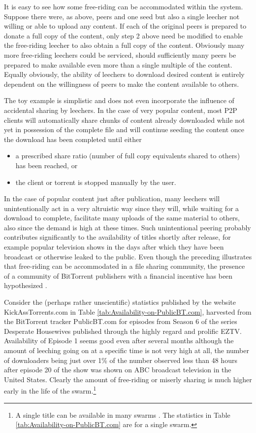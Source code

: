 \documentclass[12pt,english]{apa6}
\begin{document}
It is easy to see how some free-riding can be accommodated within
the system. Suppose there were, as above,  peers and one seed
but also a single leecher not willing or able to upload any content.
If each of the  original peers is prepared to donate a full copy
of the content, only step 2 above need be modified to enable the free-riding
leecher to also obtain a full copy of the content. Obviously many
more free-riding leechers could be serviced, should sufficiently many
peers be prepared to make available even more than a single multiple
of the content. Equally obviously, the ability of leechers to download
desired content is entirely dependent on the willingness of peers
to make the content available to others.

The toy example is simplistic and does not even incorporate the influence
of accidental sharing by leechers. In the case of very popular content,
most P2P clients will automatically share chunks of content already
downloaded while not yet in possession of the complete file and will
continue seeding the content once the download has been completed
until either
\begin{itemize}
\item a prescribed share ratio (number of full copy equivalents shared to
others) has been reached, or
\item the client or torrent is stopped manually by the user.
\end{itemize}
In the case of popular content just after publication, many leechers
will unintentionally act in a very altruistic way since they will,
while waiting for a download to complete, facilitate many uploads
of the same material to others, also since the demand is high at these
times. Such unintentional peering probably contributes significantly
to the availability of titles shortly after release, for example popular
television shows in the days after which they have been broadcast
or otherwise leaked to the public. Even though the preceding illustrates
that free-riding can be accommodated in a file sharing community,
the presence of a community of BitTorrent publishers with a financial
incentive has been hypothesized \citep{Cuevas:2010:CPB:1921168.1921183}.

Consider the (perhaps rather unscientific) statistics published by
the website KickAssTorrents.com in Table \ref{tab:Availability-on-PublicBT.com},
harvested from the BitTorrent tracker PublicBT.com for episodes from
Season 6 of the series Desperate Housewives published through the
highly regard and prolific EZTV. Availability of Episode 1 seems good
even after several months although the amount of leeching going on
at a specific time is not very high at all, the number of downloaders
being just over 1\% of the number observed less than 48 hours after
episode 20 of the show was shown on ABC broadcast television in the
United States. Clearly the amount of free-riding or miserly sharing
is much higher early in the life of the swarm.\footnote{A single title can be available in many swarms \citep{VinkoEA}. The
statistics in Table \ref{tab:Availability-on-PublicBT.com} are for
a single swarm.}
\end{document}
